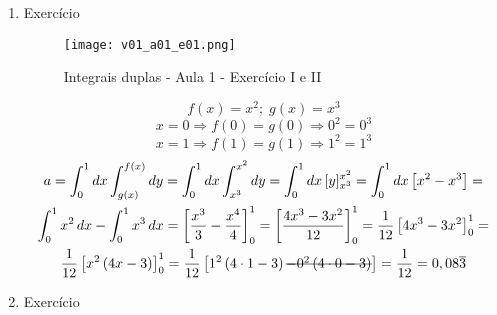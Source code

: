 \begin{enumerate}
	\item Exercício
	
	\begin{figure}[htb]
		\caption{Integrais duplas - Aula 1 - Exercício I e II}
		\label{v01_a01_e01}
		\centering
		\texttt{[image: v01\_a01\_e01.png]}		
	\end{figure}
	
	\begin{equation*}
		f(x) = x^2;\; g(x) = x^3
	\end{equation*}			
	\begin{equation*}
		x = 0 \Rightarrow f(0) = g(0) \Rightarrow 0^2 = 0^3
	\end{equation*}
	\begin{equation*}
		x = 1 \Rightarrow f(1) = g(1) \Rightarrow 1^2 = 1^3
	\end{equation*}
	\begin{gather*}
		a = \int_0^1 dx \int_{g(x)}^{f(x)} dy = \int_0^1 dx \int_{x^3}^{x^2} dy = \int_0^1 dx\, [y]_{x^3}^{x^2} = \int_0^1 dx \left[x^2 - x^3\right] =\\ \int_0^1 x^2\, dx - \int_0^1 x^3\, dx = \left[\dfrac{x^3}{3} - \dfrac{x^4}{4}\right]_0^1 = \left[\dfrac{4x^3 - 3x^2}{12}\right]_0^1 = \dfrac{1}{12}\left[4x^3 - 3x^2\right]_0^1 =\\ \dfrac{1}{12}\left[x^2\left(4x - 3\right)\right]_0^1 = \dfrac{1}{12}\left[1^2\left(4 \cdot 1 - 3\right) \overstrike{- 0^2\left(4 \cdot 0 - 3\right)}\right] = \dfrac{1}{12} = 0,08\overline{3}			
	\end{gather*}
						
	\item Exercício
	

\end{enumerate}

